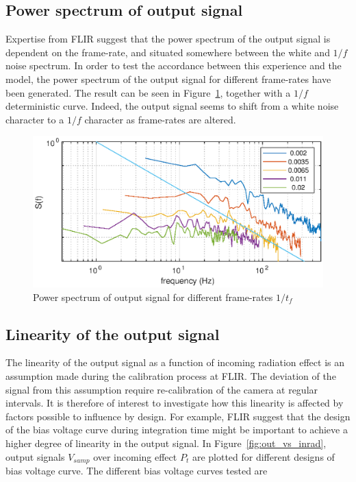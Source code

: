 \subsection{Power spectrum of output signal}
Expertise from FLIR suggest that the power spectrum of the output signal is dependent on the frame-rate, and situated somewhere between the white and $1/f$ noise spectrum.
In order to test the accordance between this experience and the model, the power spectrum of the output signal for different frame-rates have been generated. The result can be seen in
Figure~\ref{fig:pspec}, together with a $1/f$ deterministic curve. Indeed, the output signal seems to shift from a white noise character to a $1/f$ character as frame-rates are altered.
\begin{figure}[H]
 \begin{center}
\includegraphics[scale=0.9]{gfx/pspec.eps}
  \caption{Power spectrum of output signal for different frame-rates $1/t_f$}
  \label{fig:pspec}
  \end{center}
\end{figure}

\subsection{Linearity of the output signal}
The linearity of the output signal as a function of incoming radiation effect is an assumption made during the calibration process at FLIR. The deviation of the signal from this assumption
require re-calibration of the camera at regular intervals. It is therefore of interest to investigate how this linearity is affected by factors possible to influence by design. For example, FLIR suggest that the design of the bias voltage curve during integration time might be important to achieve a higher degree of linearity in the output signal. In Figure~\ref{fig:out_vs_inrad}, output signals $V_{samp}$ over incoming effect $P_{t}$ are plotted for different designs of bias voltage curve. The different bias voltage curves tested are

